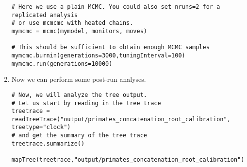 \begin{enumerate}
{\begin{snugshade*}
\begin{lstlisting}
# Here we use a plain MCMC. You could also set nruns=2 for a replicated analysis
# or use mcmcmc with heated chains.
mymcmc = mcmc(mymodel, monitors, moves)

# This should be sufficient to obtain enough MCMC samples
mymcmc.burnin(generations=3000,tuningInterval=100)
mymcmc.run(generations=10000)
\end{lstlisting}
\end{snugshade*}}

\item Now we can perform some post-run analyses.
{\tt \begin{snugshade*}
\begin{lstlisting}
# Now, we will analyze the tree output.
# Let us start by reading in the tree trace
treetrace = readTreeTrace("output/primates_concatenation_root_calibration", treetype="clock")
# and get the summary of the tree trace
treetrace.summarize()

mapTree(treetrace,"output/primates_concatenation_root_calibration")
\end{lstlisting}
\end{snugshade*}}

\end{enumerate}







